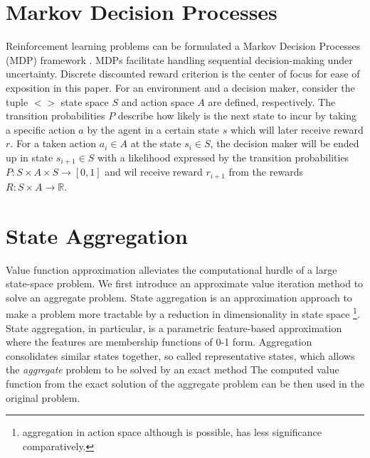 \documentclass{article}
\begin{document}
\section{Markov Decision Processes}
\label{sec:mdp}
    Reinforcement learning problems can be formulated a Markov Decision Processes (MDP)
    framework \cite{Puterman1994, Sutton1998}.
    MDPs facilitate handling sequential decision-making under uncertainty.
    Discrete discounted reward criterion is the center of focus for ease of exposition in this paper.
    For an environment and a decision maker, consider the tuple $<>$ state space $S$ and action space $A$ are defined,
respectively.
    The transition probabilities $P$ describe how likely is the next state to incur by taking a specific action
    $a$ by the agent in a certain state $s$ which will later receive reward $r$.
    For a taken action $a_i \in A$ at the state $s_i \in S$, the decision maker will be ended up in state $s_{i+1}
    \in S$ with a likelihood expressed by the transition probabilities $P : S \times A \times S \rightarrow [0, 1]$
    and wil receive reward $r_{i+1}$ from the rewards $R : S \times A \rightarrow \mathbb{R}$.

%


\section{State Aggregation}
\label{sec:state-aggregation}
    Value function approximation alleviates the computational hurdle of a large state-space problem.
    We first introduce an approximate value iteration method to solve an aggregate problem.
    State aggregation is an approximation approach to make a problem more tractable by a reduction in dimensionality in
    state space \footnote{aggregation in action space although is possible, has less significance comparatively.}.
    State aggregation, in particular, is a parametric feature-based approximation where the features are membership
    functions of 0-1 form.
    Aggregation consolidates similar states together, so called representative states, which allows the
    \textit{aggregate} problem to be solved by an exact method \cite{Bertsekas2019}
    The computed value function from the exact solution of the aggregate problem can be then used in the original
    problem.
\end{document}
